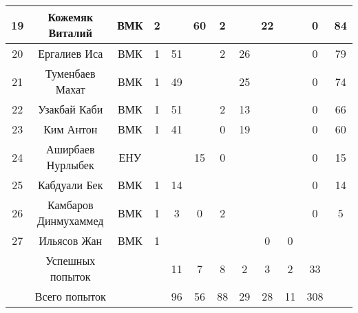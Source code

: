 \begin{center}
\begin{longtable}{|c|c|c|c|*{6}{c|}c|c|}
 \hline
19 & 	Кожемяк Виталий & 	ВМК & 2 & 	  & 	60 & 	2 & 	  & 	22 & 	  & 	0 & 	84 \\ 
 \hline
20 & 	Ергалиев Иса & 	ВМК &  1 &	51 & 	  & 	2 & 	26 & 	  & 	  & 	0 & 	79 \\ 
 \hline
21 & 	Туменбаев Махат & 	ВМК & 1 & 	49 & 	  & 	  & 	25 & 	  & 	  & 	0 & 	74 \\ 
 \hline
22 & 	Узакбай Каби & 	ВМК & 1 & 	51 & 	  & 	2 & 	13 & 	  & 	  & 	0 & 	66 \\ 
 \hline
23 & 	Ким Антон & 	ВМК & 1 & 	41 & 	  & 	0 & 	19 & 	  & 	  & 	0 & 	60 \\ 
 \hline
24 & 	Аширбаев Нурлыбек & ЕНУ  & 	 & 	  & 	15 & 	0 & 	  & 	  & 	  & 	0 & 	15 \\ 
 \hline
25 & 	Кабдуали Бек & 	ВМК & 1 & 	14 & 	  & 	  & 	  & 	  & 	  & 	0 & 	14 \\ 
 \hline
26 & 	Камбаров Динмухаммед & 	ВМК & 1 & 	3 & 	0 & 	2 & 	  & 	  & 	  & 	0 & 	5 \\ 
 \hline
27 & 	Ильясов Жан & 	ВМК & 1 & 	  & 	  & 	  & 	  & 	0 & 	0 & 	 & 	 \\ 
 \hline
 & 	Успешных попыток & 	&	& 11 & 	7 & 	8 & 	2 & 	3 & 	2 & 	33 & 	 \\ 
 \hline
 & 	Всего попыток & 	&	& 96 & 	56 & 	88 & 	29 & 	28 & 	11 & 	308 & 	 \\ 
 \hline
\end{longtable}
\end{center}
